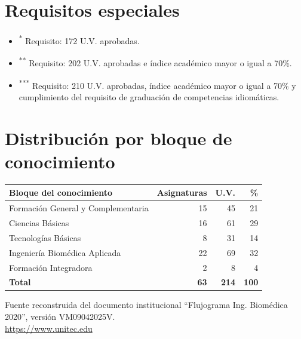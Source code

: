 \documentclass[10pt,letterpaper]{article}
\begin{document}
\normalsize
\section*{Requisitos especiales}

\begin{itemize}
  \item \textsuperscript{*} Requisito: 172 U.V. aprobadas.
  \item \textsuperscript{**} Requisito: 202 U.V. aprobadas e índice académico mayor o igual a 70\%.
  \item \textsuperscript{***} Requisito: 210 U.V. aprobadas, índice académico mayor o igual a 70\% y cumplimiento del requisito de graduación de competencias idiomáticas.
\end{itemize}

\section*{Distribución por bloque de conocimiento}

\begin{tabularx}{\textwidth}{Xrrr}
\toprule
Bloque del conocimiento & Asignaturas & U.V. & \% \\
\midrule
Formación General y Complementaria & 15 & 45 & 21 \\
Ciencias Básicas & 16 & 61 & 29 \\
Tecnologías Básicas & 8 & 31 & 14 \\
Ingeniería Biomédica Aplicada & 22 & 69 & 32 \\
Formación Integradora & 2 & 8 & 4 \\
\midrule
\textbf{Total} & \textbf{63} & \textbf{214} & \textbf{100} \\
\bottomrule
\end{tabularx}

\vfill
\footnotesize Fuente reconstruida del documento institucional ``Flujograma Ing. Biomédica 2020'', versión VM09042025V.\\
\url{https://www.unitec.edu}
\end{document}
